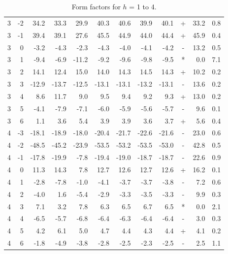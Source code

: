\begin{table}[htbp]
\begin{tabular}{rrrrrrrrrcrr}
3 & -2 &  34.2 &  33.3 &  29.9 &  40.3 &   40.6 &  39.9 &   40.1 & + & 33.2 & 0.8 \\ 
3 & -1 &  39.4 &  39.1 &  27.6 &  45.5 &   44.9 &  44.0 &   44.4 & + & 45.9 & 0.4 \\ 
3 &  0 &  -3.2 &  -4.3 &  -2.3 &  -4.3 &   -4.0 &  -4.1 &   -4.2 & - & 13.2 & 0.5 \\ 
3 &  1 &  -9.4 &  -6.9 & -11.2 &  -9.2 &   -9.6 &  -9.8 &   -9.5 & * & 0.0 & 7.1 \\ 
3 &  2 &  14.1 &  12.4 &  15.0 &  14.0 &   14.3 &  14.5 &   14.3 & + & 10.2 & 0.2 \\ 
3 &  3 & -12.9 & -13.7 & -12.5 & -13.1 &  -13.1 & -13.2 &  -13.1 & - & 13.6 & 0.2 \\ 
3 &  4 &   8.6 &  11.7 &   9.0 &   9.5 &    9.4 &   9.2 &    9.3 & + & 13.0 & 0.2 \\ 
3 &  5 &  -4.1 &  -7.9 &  -7.1 &  -6.0 &   -5.9 &  -5.6 &   -5.7 & - & 9.6 & 0.1 \\ 
3 &  6 &   1.1 &   3.6 &   5.4 &   3.9 &    3.9 &   3.6 &    3.7 & + & 5.6 & 0.4 \\ 
4 & -3 & -18.1 & -18.9 & -18.0 & -20.4 &  -21.7 & -22.6 &  -21.6 & - & 23.0 & 0.6 \\ 
4 & -2 & -48.5 & -45.2 & -23.9 & -53.5 &  -53.2 & -53.5 &  -53.0 & - & 42.8 & 0.5 \\ 
4 & -1 & -17.8 & -19.9 &  -7.8 & -19.4 &  -19.0 & -18.7 &  -18.7 & - & 22.6 & 0.9 \\ 
4 &  0 &  11.3 &  14.3 &   7.8 &  12.7 &   12.6 &  12.7 &   12.6 & + & 16.2 & 0.1 \\ 
4 &  1 &  -2.8 &  -7.8 &  -1.0 &  -4.1 &   -3.7 &  -3.7 &   -3.8 & - & 7.2 & 0.6 \\ 
4 &  2 &  -4.0 &   1.6 &  -5.4 &  -2.9 &   -3.3 &  -3.5 &   -3.3 & - & 9.9 & 0.3 \\ 
4 &  3 &   7.1 &   3.2 &   7.8 &   6.3 &    6.5 &   6.7 &    6.5 & * & 0.0 & 2.1 \\ 
4 &  4 &  -6.5 &  -5.7 &  -6.8 &  -6.4 &   -6.3 &  -6.4 &   -6.4 & - & 3.0 & 0.3 \\ 
4 &  5 &   4.2 &   6.1 &   5.0 &   4.7 &    4.4 &   4.3 &    4.4 & + & 4.1 & 0.2 \\ 
4 &  6 &  -1.8 &  -4.9 &  -3.8 &  -2.8 &   -2.5 &  -2.3 &   -2.5 & - & 2.5 & 1.1 \\ 
\hline
\end{tabular}
  \caption[Form factors for $h$ = 1 to 4]
  {Form factors for $h$ = 1 to 4.}
  \label{tab:LAXS_fits1}
\end{table}

